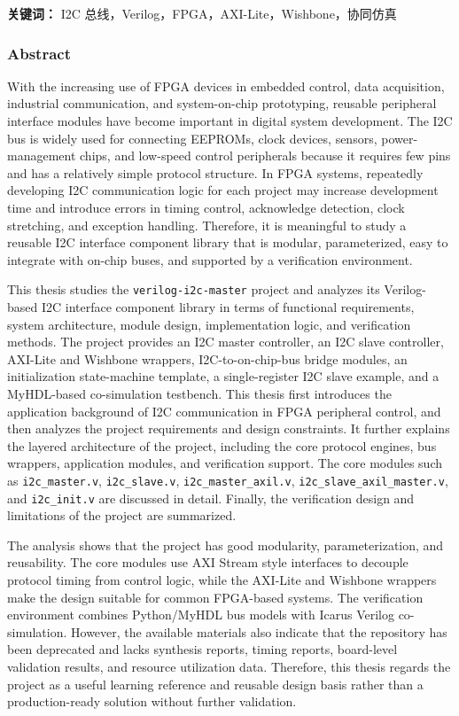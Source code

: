 \textbf{关键词：} I2C 总线，Verilog，FPGA，AXI-Lite，Wishbone，协同仿真

\subsubsection{Abstract}\label{abstract}

With the increasing use of FPGA devices in embedded control, data acquisition, industrial communication, and system-on-chip prototyping, reusable peripheral interface modules have become important in digital system development. The I2C bus is widely used for connecting EEPROMs, clock devices, sensors, power-management chips, and low-speed control peripherals because it requires few pins and has a relatively simple protocol structure. In FPGA systems, repeatedly developing I2C communication logic for each project may increase development time and introduce errors in timing control, acknowledge detection, clock stretching, and exception handling. Therefore, it is meaningful to study a reusable I2C interface component library that is modular, parameterized, easy to integrate with on-chip buses, and supported by a verification environment.

This thesis studies the \texttt{verilog-i2c-master} project and analyzes its Verilog-based I2C interface component library in terms of functional requirements, system architecture, module design, implementation logic, and verification methods. The project provides an I2C master controller, an I2C slave controller, AXI-Lite and Wishbone wrappers, I2C-to-on-chip-bus bridge modules, an initialization state-machine template, a single-register I2C slave example, and a MyHDL-based co-simulation testbench. This thesis first introduces the application background of I2C communication in FPGA peripheral control, and then analyzes the project requirements and design constraints. It further explains the layered architecture of the project, including the core protocol engines, bus wrappers, application modules, and verification support. The core modules such as \texttt{i2c\_master.v}, \texttt{i2c\_slave.v}, \texttt{i2c\_master\_axil.v}, \texttt{i2c\_slave\_axil\_master.v}, and \texttt{i2c\_init.v} are discussed in detail. Finally, the verification design and limitations of the project are summarized.

The analysis shows that the project has good modularity, parameterization, and reusability. The core modules use AXI Stream style interfaces to decouple protocol timing from control logic, while the AXI-Lite and Wishbone wrappers make the design suitable for common FPGA-based systems. The verification environment combines Python/MyHDL bus models with Icarus Verilog co-simulation. However, the available materials also indicate that the repository has been deprecated and lacks synthesis reports, timing reports, board-level validation results, and resource utilization data. Therefore, this thesis regards the project as a useful learning reference and reusable design basis rather than a production-ready solution without further validation.

